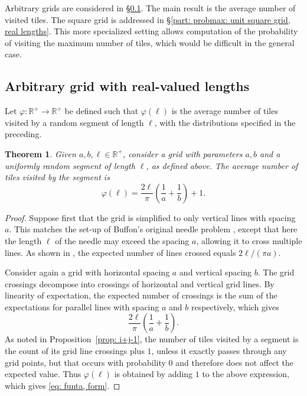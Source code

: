 \documentclass[12pt, a4paper]{article}
\newcommand{\funta}{\varphi} %
\newcommand{\len}{\ell} %
\newtheorem{theorem}{Theorem}%
\begin{document}
Arbitrary grids are considered in \S\ref{part: probmax: arbitrary grid, real lengths}. The main result is the average number of visited tiles. The square grid is addressed in \S\ref{part: probmax: unit square grid, real lengths}. This more specialized setting allows computation of the probability of visiting the maximum number of tiles, which would be difficult in the general case.


\subsection{Arbitrary grid with real-valued lengths}
\label{part: probmax: arbitrary grid, real lengths}

Let $\funta: \mathbb R^+ \to \mathbb R^+$ be defined such that $\funta(\len)$ is the average number of tiles visited by a random segment of length $\len$, with the distributions specified in the preceding.

\begin{theorem}
\label{theo: funta, form}
Given $a, b, \len \in \mathbb R^+$, consider a grid with parameters $a, b$ and a uniformly random segment of length $\len$, as defined above. The average number of tiles visited by the segment is 
\begin{equation}
\label{eq: funta, form}
\funta(\len) = \frac{2\len}{\pi}\left(\frac 1 a + \frac 1 b\right) + 1.
\end{equation}
\end{theorem}

\begin{proof}
Suppose first that the grid is simplified to only vertical lines with spacing $a$. This matches the set-up of Buffon's original needle problem \cite[section~1.1]{Mathai99}, except that here the length $\len$ of the needle may exceed the spacing $a$, allowing it to cross multiple lines. As shown in \cite{Ramaley69}, the expected number of lines crossed equals $2\len/(\pi a)$.

Consider again a grid with horizontal spacing $a$ and vertical spacing $b$. The grid crossings decompose into crossings of horizontal and vertical grid lines. By linearity of expectation, the expected number of crossings is the sum of the expectations for parallel lines with spacing $a$ and $b$ respectively, which gives
\[
\frac{2\len}{\pi}\left(\frac 1 a + \frac 1 b\right).
\]
As noted in Proposition~\ref{prop: i+j-1}, the number of tiles visited by a segment is the count of its grid line crossings plus $1$, unless it exactly passes through any grid points, but that occurs with probability $0$ and therefore does not affect the expected value. Thus $\funta(\len)$ is obtained by adding $1$ to the above expression, which gives \eqref{eq: funta, form}.
\end{proof}
\end{document}
